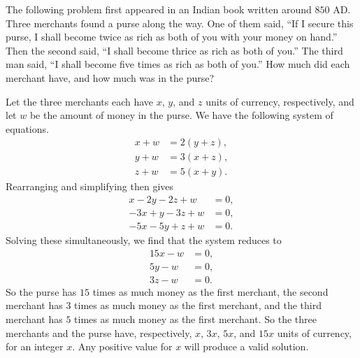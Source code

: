  The following problem first appeared in an Indian book
written around $850$ AD. Three merchants found a purse along the
way. One of them said, ``If I secure this purse, I shall become twice
as rich as both of you with your money on hand.'' Then the second
said, ``I shall become thrice as rich as both of you.'' The third man
said, ``I shall become five times as rich as both of you.'' How much
did each merchant have, and how much was in the purse?
\begin{solution}
  Let the three merchants each have $x$, $y$, and $z$ units of
  currency, respectively, and let $w$ be the amount of money in the
  purse. We have the following system of equations.
  \begin{align*}
    x + w &= 2(y + z), \\
    y + w &= 3(x + z), \\
    z + w &= 5(x + y).
  \end{align*}
  Rearranging and simplifying then gives
  \begin{align*}
    x - 2y - 2z + w &= 0, \\
    -3x + y - 3z + w &= 0, \\
    -5x -5y + z + w &= 0.
  \end{align*}
  Solving these simultaneously, we find that the system reduces to
  \begin{align*}
    15x - w &= 0, \\
    5y - w &= 0, \\
    3z - w &= 0.
  \end{align*}
  So the purse has $15$ times as much money as the first merchant, the
  second merchant has $3$ times as much money as the first merchant,
  and the third merchant has $5$ times as much money as the first
  merchant. So the three merchants and the purse have, respectively,
  $x$, $3x$, $5x$, and $15x$ units of currency, for an integer
  $x$. Any positive value for $x$ will produce a valid solution.
\end{solution}

